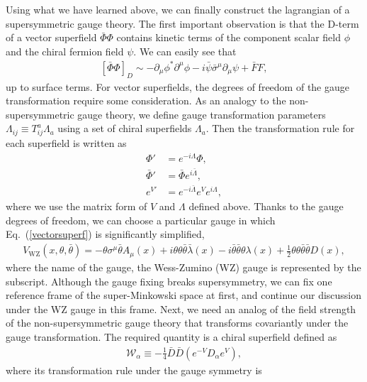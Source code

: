 \documentclass[12pt,twoside,book]{article}
\begin{document}
Using what we have learned above, we can finally construct the lagrangian of a supersymmetric gauge theory.
The first important observation is that the D-term of a vector superfield $\bar{\Phi} \Phi$ contains kinetic terms of the component scalar field $\phi$ and the chiral fermion field $\psi$.
We can easily see that
\begin{align}
  \left[ \bar{\Phi} \Phi \right]_D \sim -\partial_\mu \phi^{*}
  \partial^\mu \phi -i \bar{\psi} \bar{\sigma}^\mu \partial_\mu \psi + \bar{F}F,
\end{align}
up to surface terms.
For vector superfields, the degrees of freedom of the gauge transformation require some consideration.
As an analogy to the non-supersymmetric gauge theory, we define gauge transformation parameters $\Lambda_{i j} \equiv T^a_{i j} \Lambda_a$ using a set of chiral superfields $\Lambda_a$.
Then the transformation rule for each superfield is written as
\begin{align}
  \Phi' &= e^{-i\Lambda} \Phi,\label{chiralsfgaugetransf} \\
  \bar{\Phi}' &= \bar{\Phi} e^{i\bar{\Lambda}},  \\
  e^{V'} &= e^{-i\bar{\Lambda}} e^V e^{i\Lambda},
  \label{vectorsfgaugetransf}
\end{align}
where we use the matrix form of $V$ and $\Lambda$ defined above.
Thanks to the gauge degrees of freedom, we can choose a particular gauge in which Eq.\ (\ref{vectorsuperf}) is significantly simplified,
\begin{align}
  V_{\mathrm{WZ}} (x,\theta,\bar{\theta}) = -\theta \sigma^\mu \bar{\theta}
  A_\mu(x) + i\theta\theta \bar{\theta} \bar{\lambda}(x) -
  i\bar{\theta} \bar{\theta} \theta \lambda(x) + \frac{1}{2}
  \theta\theta \bar{\theta} \bar{\theta} D(x),
\end{align}
where the name of the gauge, the Wess-Zumino (WZ) gauge \cite{Wess:1974jb} is represented by the subscript.
Although the gauge fixing breaks supersymmetry, we can fix one reference frame of the super-Minkowski space at first, and continue our discussion under the WZ gauge in this frame.
Next, we need an analog of the field strength of the non-supersymmetric gauge theory that transforms covariantly under the gauge transformation.
The required quantity is a chiral superfield defined as
\begin{align}
  \mathcal{W}_\alpha \equiv -\frac{1}{4} \bar{D} \bar{D} (e^{-V} D_\alpha e^V),
\end{align}
where its transformation rule under the gauge symmetry is
\end{document}
